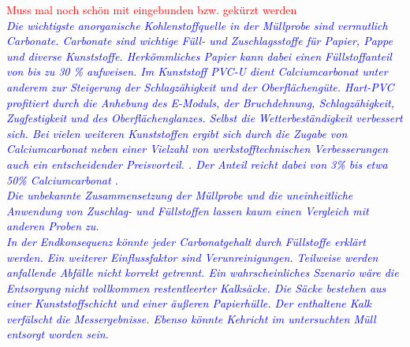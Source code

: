 \textcolor{red}{Muss mal noch schön mit eingebunden bzw. gekürzt werden}\\
\textcolor{blue}{\textit{Die wichtigste anorganische Kohlenstoffquelle in der Müllprobe sind vermutlich Carbonate.
Carbonate sind wichtige Füll- und Zuschlagsstoffe für Papier, Pappe und diverse Kunststoffe. Herkömmliches Papier kann dabei einen Füllstoffanteil von bis zu 30 \% \cite{Wikipedia.21.11.2019} aufweisen. Im Kunststoff PVC-U dient Calciumcarbonat unter anderem zur Steigerung der Schlagzähigkeit und der Oberflächengüte. Hart-PVC profitiert durch die Anhebung des E-Moduls, der Bruchdehnung, Schlagzähigkeit, Zugfestigkeit und des Oberflächenglanzes. Selbst die Wetterbeständigkeit verbessert sich. Bei vielen weiteren Kunststoffen ergibt sich durch die Zugabe von Calciumcarbonat neben einer Vielzahl von werkstofftechnischen Verbesserungen auch ein  entscheidender Preisvorteil. \cite{domininghausKunststoffeUndIhre1998}. Der Anteil reicht dabei von 3\% bis etwa 50\% Calciumcarbonat \cite{domininghausKunststoffeUndIhre1998}.\\
Die unbekannte Zusammensetzung der Müllprobe und die uneinheitliche Anwendung von Zuschlag- und Füllstoffen lassen kaum einen Vergleich mit anderen Proben zu. \\
In der Endkonsequenz könnte jeder Carbonatgehalt durch Füllstoffe erklärt werden. Ein weiterer Einflussfaktor sind Verunreinigungen. Teilweise werden anfallende Abfälle nicht korrekt getrennt. Ein wahrscheinliches Szenario wäre die Entsorgung nicht vollkommen restentleerter Kalksäcke. Die Säcke bestehen aus einer Kunststoffschicht und einer äußeren Papierhülle. Der enthaltene Kalk verfälscht die Messergebnisse. Ebenso könnte Kehricht im untersuchten Müll entsorgt worden sein.}}

\newpage

